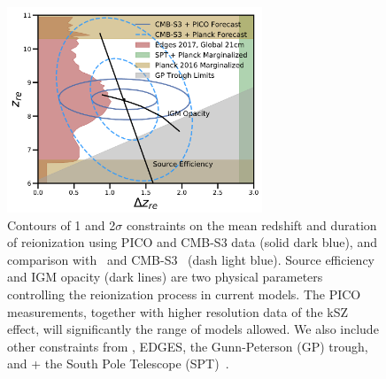 \documentclass[PICOReport.tex]{subfiles}
\begin{document}
\begin{figure}
\hspace{-0.2in}
\parbox{3.1in}{\centerline {
\includegraphics[width=3.0in]{images/Reionization_Contours_zbar_delz_PICO_NEW.pdf} } }
\hspace{0.in}
\parbox{3.5in}{
\caption{\captiontext 
Contours of 1 and 2$\sigma$ constraints on the mean redshift and duration of reionization using PICO and CMB-S3 data (solid dark blue), and comparison with \planck\ and CMB-S3~ (dash light blue). Source efficiency and IGM opacity (dark lines) are two physical parameters controlling the reionization process in current models. The PICO measurements, together with higher resolution data of the kSZ effect, will significantly the range of models allowed. We also include other constraints from \planck , EDGES, the Gunn-Peterson (GP) trough, and \planck + the South Pole Telescope (SPT)~\citep{Planck2018_VI,EDGES2017,Fan2006,Planck2016_reion}.  
\label{fig:ReionizationPICO}
} }
\vspace{-0.1in}
\end{figure}
\end{document}
